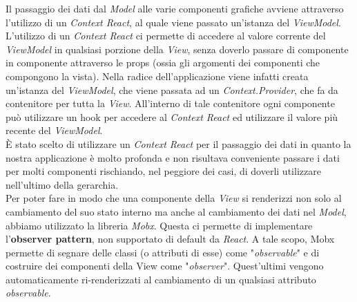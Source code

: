 Il passaggio dei dati dal \textit{Model} alle varie componenti grafiche avviene attraverso l'utilizzo di un \textit{Context React}, al quale viene passato un'istanza del \textit{ViewModel}. L'utilizzo di un \textit{Context React} ci permette di accedere al valore corrente del \textit{ViewModel} in qualsiasi porzione della \textit{View}, senza doverlo passare di componente in componente attraverso le props (ossia gli argomenti dei componenti che compongono la vista). Nella radice dell'applicazione viene infatti creata un'istanza del \textit{ViewModel}, che viene passata ad un \textit{Context.Provider}, che fa da contenitore per tutta la \textit{View}. All'interno di tale contenitore ogni componente può utilizzare un hook per accedere al \textit{Context React} ed utilizzare il valore più recente del \textit{ViewModel}.\\ È stato scelto di utilizzare un \textit{Context React} per il passaggio dei dati in quanto la nostra applicazione è molto profonda e non risultava conveniente passare i dati per molti componenti rischiando, nel peggiore dei casi, di doverli utilizzare nell'ultimo della gerarchia.\\
Per poter fare in modo che una componente della \textit{View} si renderizzi non solo al cambiamento del suo stato interno ma anche al cambiamento dei dati nel \textit{Model}, abbiamo utilizzato la libreria \textit{Mobx}. Questa ci permette di implementare l'\textbf{observer pattern}, non supportato di default da \textit{React}. A tale scopo, Mobx permette di segnare delle classi (o attributi di esse) come "\textit{observable}" e di costruire dei componenti della View come "\textit{observer}". Quest'ultimi vengono automaticamente ri-renderizzati al cambiamento di un qualsiasi attributo \textit{observable}.
\newpage

